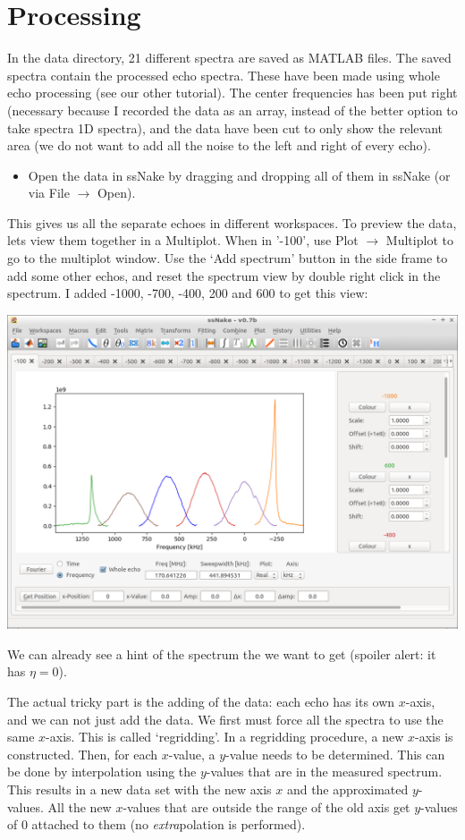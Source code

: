 \documentclass[11pt,a4paper]{article}
\begin{document}
\section{Processing}
In the data directory, 21 different spectra are saved as MATLAB files. The saved spectra contain the
processed echo spectra. These have been made using whole echo processing (see our other tutorial).
The center frequencies has been put right (necessary because I recorded the data as an array,
instead of the better option to take spectra 1D spectra), and the data have been cut to only show
the relevant area (we do not want to add all the noise to the left and right of every echo).

\begin{itemize}
\item Open the data in ssNake by dragging and dropping all of them in ssNake (or via File
  $\longrightarrow$ Open).
\end{itemize}
This gives us all the separate echoes in different workspaces. To preview the data, lets view them
together in a Multiplot. When in '-100', use Plot $\longrightarrow$ Multiplot to go to the multiplot
window. Use the `Add spectrum' button in the side frame to add some other echos, and reset the
spectrum view by double right click in the spectrum. I added -1000, -700, -400, 200 and 600 to get
this view:

\begin{center}
\includegraphics[width=0.8\linewidth]{Figs/Fig1.png}
\end{center}

We can already see a hint of the spectrum the we want to get (spoiler alert: it has $\eta=0$).

The actual tricky part is the adding of the data: each echo has its own $x$-axis, and we can not
just add the data. We first must force all the spectra to use the same $x$-axis. This is called
`regridding'. In a regridding procedure, a new $x$-axis is constructed. Then, for each $x$-value, a
$y$-value needs to be determined. This can be done by interpolation using the $y$-values that are in
the measured spectrum. This results in a new data set with the new axis $x$ and the approximated
$y$-values. All the new $x$-values that are outside the range of the old axis get $y$-values of 0
attached to them (no \textit{extra}polation is performed).
\end{document}
